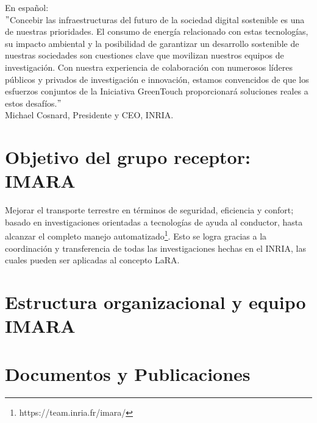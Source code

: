 En español:\\

$"$Concebir las infraestructuras del futuro de la sociedad digital sostenible es una de nuestras prioridades. El consumo de energía relacionado con estas tecnologías, su impacto ambiental y la posibilidad de garantizar un desarrollo sostenible de nuestras sociedades son cuestiones clave que movilizan nuestros equipos de investigación. Con nuestra experiencia de colaboración con numerosos líderes públicos y privados de investigación e innovación, estamos convencidos de que los esfuerzos conjuntos de la Iniciativa GreenTouch proporcionará soluciones reales a estos desafíos.$"$\\

Michael Cosnard, Presidente y CEO, INRIA.

\section{Objetivo del grupo receptor: IMARA}

Mejorar el transporte terrestre en términos de seguridad, eficiencia y confort; basado en investigaciones orientadas a tecnologías de ayuda al conductor, hasta alcanzar el completo manejo automatizado\footnote{https://team.inria.fr/imara/}. Esto se logra gracias a la coordinación y transferencia de todas las investigaciones hechas en el INRIA, las cuales pueden ser aplicadas al concepto LaRA.

\section{Estructura organizacional y equipo IMARA}

\section{Documentos y Publicaciones}

